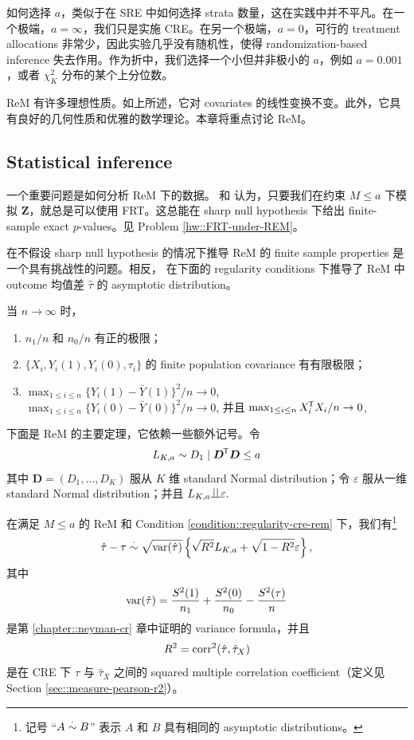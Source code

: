 如何选择 $a$，类似于在 SRE 中如何选择 strata 数量，这在实践中并不平凡。在一个极端，$a = \infty$，我们只是实施 CRE。在另一个极端，$a=0$，可行的 treatment allocations 非常少，因此实验几乎没有随机性，使得 randomization-based inference 失去作用。作为折中，我们选择一个小但并非极小的 $a$，例如 $a=0.001$，或者 $\chi^2_K$ 分布的某个上分位数。

ReM 有许多理想性质。如上所述，它对 covariates 的线性变换不变。此外，它具有良好的几何性质和优雅的数学理论。本章将重点讨论 ReM。

\subsection{Statistical inference}

一个重要问题是如何分析 ReM 下的数据。\citet{bruhn2009pursuit} 和 \citet{morgan2012rerandomization} 认为，只要我们在约束 $M\leq a$ 下模拟 $\boldsymbol{Z}$，就总是可以使用 FRT。这总能在 sharp null hypothesis 下给出 finite-sample exact $p$-values。见 Problem \ref{hw::FRT-under-REM}。

在不假设 sharp null hypothesis 的情况下推导 ReM 的 finite sample properties 是一个具有挑战性的问题。相反，\citet{li2018asymptotic} 在下面的 regularity conditions 下推导了 ReM 中 outcome 均值差 $\hat{\tau}$ 的 asymptotic distribution。

\begin{condition}\label{condition::regularity-cre-rem}
当 $n\rightarrow \infty$ 时，
\begin{enumerate}
\item 
$n_1/n$ 和 $n_0/n$ 有正的极限；
\item 
$\{  X_i, Y_i(1), Y_i(0), \tau_i \}$ 的 finite population covariance 有有限极限；
\item
$\max_{1\leq i \leq n}  \{   Y_i(1) - \bar{Y}(1) \} ^2/n \rightarrow 0 $,
$\max_{1\leq i \leq n}  \{   Y_i(0) - \bar{Y}(0) \}^2/n \rightarrow 0 $,
并且 $\max_{1\leq i \leq n}   X_i ^{\mkern-1.5mu\mathsf{T}} X_i/n \rightarrow 0 $,
\end{enumerate}
\end{condition} 

下面是 ReM 的主要定理，它依赖一些额外记号。令
$$
L_{K,a} \sim D_1\mid \boldsymbol{D}^{\mkern-1.5mu\mathsf{T}} \boldsymbol{D} \leq a
$$ 
其中 $\boldsymbol{D} = (D_1,\ldots, D_K)$ 服从 $K$ 维 standard Normal distribution；令 $ \varepsilon$ 服从一维 standard Normal distribution；并且 $L_{K,a}  \ind \varepsilon .$

\begin{theorem}\label{thm::remasymptotics}
在满足 $M\leq a$ 的 ReM 和 Condition \ref{condition::regularity-cre-rem} 下，我们有\footnote{记号 ``$A \stackrel{\cdot}{\sim} B$'' 表示 $A$ 和 $B$ 具有相同的 asymptotic distributions。}
$$
\hat{\tau} - \tau \stackrel{\cdot}{\sim} \sqrt{ \textup{var}(\hat \tau) }  \left\{   \sqrt{R^2} L_{K,a}  + \sqrt{1-R^2} \varepsilon \right\},
$$
其中
$$
\textup{var}( \hat{\tau} ) = \frac{S^2(1)}{n_1} + \frac{S^2(0)}{n_0} - \frac{S^2(\tau)}{n}
$$
是第 \ref{chapter::neyman-cr} 章中证明的 \citet{Neyman:1923} variance formula，并且
$$
R^2 = \textup{corr}^2(\hat{\tau}, \hat{\tau}_X   )
$$
是在 CRE 下 $\hat{\tau}$ 与 $\hat{\tau}_X $ 之间的 squared multiple correlation coefficient（定义见 Section \ref{sec::measure-pearson-r2}）。
\end{theorem}

